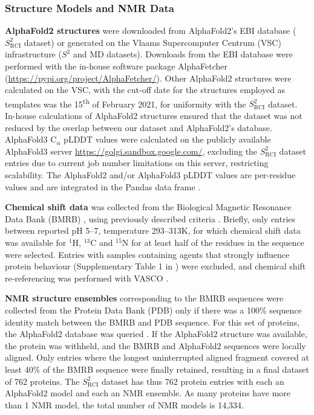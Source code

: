 \subsubsection{Structure Models and NMR Data}\label{sec:S2RCI}

\textbf{AlphaFold2 structures} were downloaded from AlphaFold2's EBI database \cite{varadi_alphafold_2021} ($S^{2}_{\text{RCI}}$ dataset) or generated on the Vlaams Supercomputer Centrum (VSC) infrastructure ($S^{2}$ and MD datasets). Downloads from the EBI database \cite{varadi_alphafold_2021} were performed with the in-house software package AlphaFetcher (\url{https://pypi.org/project/AlphaFetcher/}). Other AlphaFold2 structures were calculated on the VSC, with the cut-off date for the structures employed as templates was the 15\textsuperscript{th} of February 2021, for uniformity with the $S^{2}_{\text{RCI}}$ dataset. In-house calculations of AlphaFold2 structures ensured that the dataset was not reduced by the overlap between our dataset and AlphaFold2's database. 
AlphaFold3 C$_\alpha$ pLDDT values were calculated on the publicly available AlphaFold3 server \url{https://golgi.sandbox.google.com/}, excluding the $S^{2}_{\text{RCI}}$ dataset entries due to current job number limitations on this server, restricting scalability. The AlphaFold2 and/or AlphaFold3 pLDDT values are per-residue values and are integrated in the Pandas data frame \cite{mckinney-proc-scipy-2010, reback2020pandas}.

\textbf{Chemical shift data} was collected from the Biological Magnetic Resonance Data Bank (BMRB) \cite{hoch_biological_2023}, using previously described criteria \cite{cilia_protein_2013, gavalda-garcia_data-driven_2024}. Briefly, only entries between reported pH 5–7, temperature 293–313K, for which chemical shift data was available for $^{1}\text{H}$, $^{13}\text{C}$ and $^{15}\text{N}$ for at least half of the residues in the sequence were selected. Entries with samples containing agents that strongly influence protein behaviour (Supplementary Table 1 in \cite{cilia_protein_2013}) were excluded, and chemical shift re-referencing was performed with VASCO \cite{rieping_validation_2010}.

\textbf{NMR structure ensembles} corresponding to the BMRB sequences were collected from the Protein Data Bank (PDB) \cite{berman_protein_2000} only if there was a 100\% sequence identity match between the BMRB and PDB sequence. For this set of proteins, the AlphaFold2 database was queried \cite{varadi_alphafold_2021}. If the AlphaFold2 structure was available, the protein was withheld, and the BMRB and AlphaFold2 sequences were locally aligned. Only entries where the longest uninterrupted aligned fragment covered at least 40\% of the BMRB sequence were finally retained, resulting in a final dataset of 762 proteins. The $S^{2}_{\text{RCI}}$ dataset has thus 762 protein entries with each an AlphaFold2 model and each an NMR ensemble. As many proteins have more than 1 NMR model, the total number of NMR models is 14,334.

